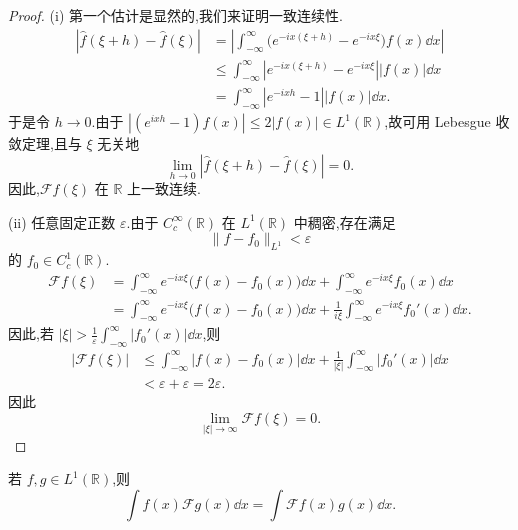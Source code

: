 \begin{proof}
(i) 第一个估计是显然的,我们来证明一致连续性.
\begin{align*}
|\hat{f}(\xi + h) - \hat{f}(\xi)| & = \left|\int_{-\infty}^{\infty}\bigl(e^{-ix(\xi+h)} - e^{-ix\xi}\bigr)f(x)\dd x\right| \\
& \leq \int_{-\infty}^{\infty}\left|e^{-ix(\xi+h)} - e^{-ix\xi}\right||f(x)|\dd x \\
& = \int_{-\infty}^{\infty}\left|e^{-ixh} - 1\right||f(x)|\dd x.
\end{align*}
于是令 $h \to 0$.由于 $|(e^{ixh} - 1)f(x)| \leq 2|f(x)| \in L^{1}(\mathbb{R})$,故可用 Lebesgue 收敛定理,且与 $\xi$ 无关地
\begin{equation*}
\lim_{h \to 0}|\hat{f}(\xi + h) - \hat{f}(\xi)| = 0.
\end{equation*}
因此,$\mathcal{F}f(\xi)$ 在 $\mathbb{R}$ 上一致连续.

(ii) 任意固定正数 $\varepsilon$.由于 $C_{c}^{\infty}(\mathbb{R})$ 在 $L^{1}(\mathbb{R})$ 中稠密,存在满足
\begin{equation*}
\| f - f_{0} \|_{L^{1}} < \varepsilon
\end{equation*}
的 $f_{0} \in C_{c}^{1}(\mathbb{R})$.
\begin{align*}
\mathcal{F}f(\xi) & = \int_{-\infty}^{\infty}e^{-ix\xi}\bigl(f(x) - f_{0}(x)\bigr)\dd x + \int_{-\infty}^{\infty}e^{-ix\xi}f_{0}(x)\dd x \\
& = \int_{-\infty}^{\infty}e^{-ix\xi}\bigl(f(x) - f_{0}(x)\bigr)\dd x + \frac{1}{i\xi}\int_{-\infty}^{\infty}e^{-ix\xi}f_{0}'(x)\dd x.
\end{align*}
因此,若 $|\xi| > \frac{1}{\varepsilon}\int_{-\infty}^{\infty}|f_{0}'(x)|\dd x$,则
\begin{align*}
|\mathcal{F}f(\xi)| &\leq \int_{-\infty}^{\infty}|f(x) - f_{0}(x)|\dd x + \frac{1}{|\xi|}\int_{-\infty}^{\infty}|f_{0}'(x)|\dd x \\
&< \varepsilon + \varepsilon = 2\varepsilon.
\end{align*}
因此
\begin{equation*}
\lim_{|\xi| \to \infty}\mathcal{F}f(\xi) = 0.
\end{equation*}
\end{proof}

\begin{lemma}\label{lem:1.2.4}
若 $f, g \in L^{1}(\mathbb{R})$,则
\begin{equation*}
\int f(x)\mathcal{F}g(x)\dd x = \int \mathcal{F}f(x)g(x)\dd x.
\end{equation*}
\end{lemma}

